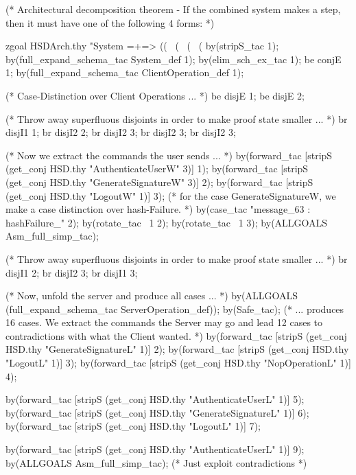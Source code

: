 \documentclass[a4paper,pdftex]{article}
\newenvironment{holz-ml}{\comment}{\endcomment}
\begin{document}
\begin{holz-ml}


(* Architectural decomposition theorem - If the combined system makes a step,
   then it must have one of the following 4 forms:
*)

zgoal HSDArch.thy 
"System =+=>  ((%
\              (%
\              (%
\              (%
by(stripS_tac 1);
by(full_expand_schema_tac System_def 1);
by(elim_sch_ex_tac 1);
be conjE 1;
by(full_expand_schema_tac ClientOperation_def 1);

(* Case-Distinction over Client Operations ... *)
be disjE 1;
be disjE 2;

(* Throw away superfluous disjoints in order to 
   make proof state smaller ... *)
br disjI1 1;
br disjI2 2;
br disjI2 3;
br disjI2 3;
br disjI2 3;

(* Now we extract the commands the user sends ... *)
by(forward_tac [stripS (get_conj HSD.thy "AuthenticateUserW" 3)] 1);
by(forward_tac [stripS (get_conj HSD.thy "GenerateSignatureW" 3)] 2);
by(forward_tac [stripS (get_conj HSD.thy "LogoutW" 1)] 3);
(* for the case GenerateSignatureW, we make a case distinction over
   hash-Failure. *)
by(case_tac "message_63 : hashFailure_" 2);
by(rotate_tac ~1 2);
by(rotate_tac ~1 3);
by(ALLGOALS Asm_full_simp_tac);
   
(* Throw away superfluous disjoints in order to 
   make proof state smaller ... *)
br disjI1 2;
br disjI2 3;
br disjI1 3;

(* Now, unfold the server and produce all cases ... *)
by(ALLGOALS (full_expand_schema_tac ServerOperation_def));
by(Safe_tac);
(* ... produces 16 cases. We extract the commands the 
   Server may go and lead 12 cases to contradictions
   with what the Client wanted. *)
by(forward_tac [stripS (get_conj HSD.thy "GenerateSignatureL" 1)] 2);
by(forward_tac [stripS (get_conj HSD.thy "LogoutL" 1)] 3);
by(forward_tac [stripS (get_conj HSD.thy "NopOperationL" 1)] 4);

by(forward_tac [stripS (get_conj HSD.thy "AuthenticateUserL" 1)] 5);
by(forward_tac [stripS (get_conj HSD.thy "GenerateSignatureL" 1)] 6);
by(forward_tac [stripS (get_conj HSD.thy "LogoutL" 1)] 7);

by(forward_tac [stripS (get_conj HSD.thy "AuthenticateUserL" 1)] 9);
by(ALLGOALS Asm_full_simp_tac); (* Just exploit contradictions *)


\end{holz-ml}
\end{document}
